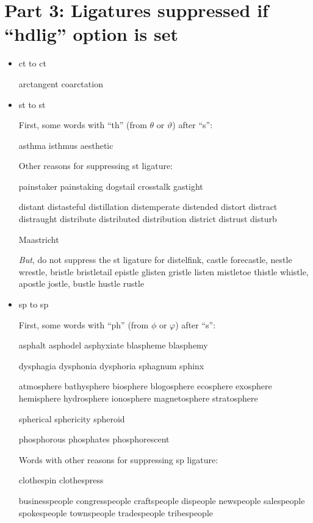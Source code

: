 \section*{Part 3: Ligatures suppressed if ``hdlig'' option is set}

\begin{itemize}

\item ct to c\hspace{0pt}t

arctangent coarctation 


\item st to s\hspace{0pt}t

First, some words with ``th'' (from $\theta$ or $\vartheta$) after ``s'':

asthma isthmus aesthetic


\medskip
Other reasons for suppressing st ligature:

painstaker painstaking dogstail crosstalk gastight

distant distasteful distillation distemperate distended distort distract distraught distribute distributed distribution district distrust disturb

Maastricht




\emph{But}, do not suppress the st ligature for  distelfink, castle forecastle, nestle wrestle, bristle bristletail epistle glisten gristle listen mistletoe thistle whistle, apostle jostle, bustle hustle rustle 




\item sp to s\hspace{0pt}p

First, some words with ``ph'' (from $\phi$ or $\varphi$) after ``s'':

asphalt asphodel asphyxiate blaspheme blasphemy

dysphagia dysphonia dysphoria sphagnum sphinx

atmosphere bathysphere biosphere blogosphere ecosphere exosphere hemisphere hydrosphere ionosphere magnetosphere stratosphere

spherical sphericity spheroid 

phosphorous phosphates phosphorescent

\medskip
Words with other reasons for suppressing sp ligature:

clothespin clothespress

businesspeople congresspeople craftspeople dispeople newspeople salespeople spokespeople townspeople tradespeople tribespeople


\end{itemize}
